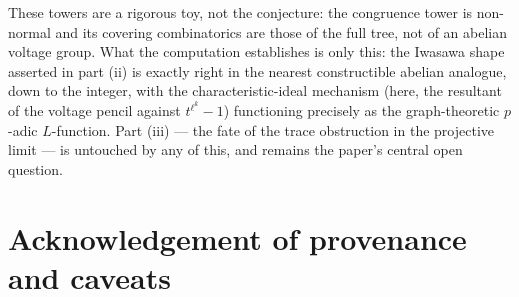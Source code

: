 \begin{remark}
These towers are a rigorous toy, not the conjecture: the congruence tower is non-normal
and its covering combinatorics are those of the full tree, not of an abelian voltage
group. What the computation establishes is only this: the Iwasawa shape asserted in
part (ii) is exactly right in the nearest constructible abelian analogue, down to the
integer, with the characteristic-ideal mechanism (here, the resultant of the voltage
pencil against $t^{\ell^k}-1$) functioning precisely as the graph-theoretic
$p$-adic $L$-function. Part (iii) --- the fate of the trace obstruction in the projective
limit --- is untouched by any of this, and remains the paper's central open question.
\end{remark}

\section*{Acknowledgement of provenance and caveats}

